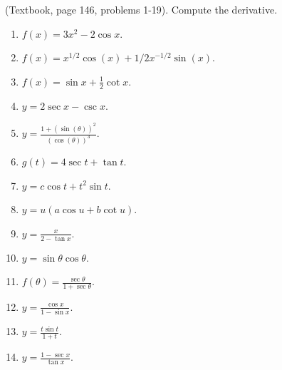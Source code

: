 
\begin{problem}(Textbook, page 146, problems 1-19).
Compute the derivative.
\begin{multicols}{2}
\begin{enumerate}
\item $f(x)= 3x^2 -2 \cos x$.

\item $f(x)=x^{1/2}\cos{}(x) +1/2x^{-1/2} \sin{}(x) $.

\item $f(x)=\sin x +\frac{1}{2}\cot x$.

\item $y=2\sec x - \csc x$.

\item $y=\frac{1+(\sin{}(\theta))^{2}}{(\cos{}(\theta))^{3}}$.

\item $g(t)=4 \sec t + \tan t$.

\item $y= c\cos t + t^2\sin t$.

\item $y=u(a\cos u + b \cot u)$.

\item $y=\frac{x}{2-\tan x}$.

\item $y=\sin \theta \cos \theta$.

\item $f(\theta)=\frac{\sec \theta}{1+\sec \theta}$.

\item $y=\frac{\cos x}{1-\sin x}$.

\item $y=\frac{t\sin t}{1+t}$.

\item $y=\frac{1-\sec x}{\tan x}$.


\end{enumerate}
\end{multicols}
\end{problem}
